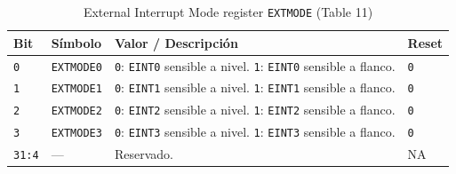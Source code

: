 \begin{table}[H]
  \centering
  \small
  \renewcommand{\arraystretch}{1.15}
  \caption{External Interrupt Mode register \texttt{EXTMODE} (Table 11)}
  \begin{tabularx}{0.96\textwidth}{|>{\centering\arraybackslash}p{}|>{\raggedright\arraybackslash}p{}|>{\raggedright\arraybackslash}X|>{\centering\arraybackslash}p{}|}
    \hline
    \textbf{Bit} & \textbf{S\'imbolo} & \textbf{Valor / Descripci\'on} & \textbf{Reset} \\
    \hline
    \texttt{0} & \texttt{EXTMODE0} & \texttt{0}: \texttt{EINT0} sensible a nivel. \texttt{1}: \texttt{EINT0} sensible a flanco. & \texttt{0} \\
    \hline
    \texttt{1} & \texttt{EXTMODE1} & \texttt{0}: \texttt{EINT1} sensible a nivel. \texttt{1}: \texttt{EINT1} sensible a flanco. & \texttt{0} \\
    \hline
    \texttt{2} & \texttt{EXTMODE2} & \texttt{0}: \texttt{EINT2} sensible a nivel. \texttt{1}: \texttt{EINT2} sensible a flanco. & \texttt{0} \\
    \hline
    \texttt{3} & \texttt{EXTMODE3} & \texttt{0}: \texttt{EINT3} sensible a nivel. \texttt{1}: \texttt{EINT3} sensible a flanco. & \texttt{0} \\
    \hline
    \texttt{31:4} & --- & Reservado. & NA \\
    \hline
  \end{tabularx}
\end{table}

